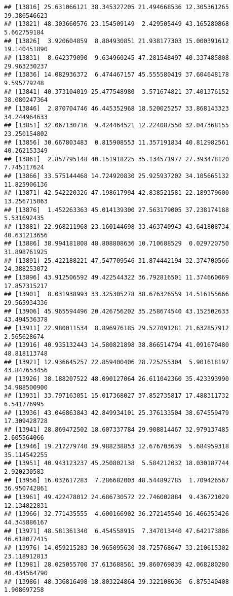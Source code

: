 \documentclass[
]{article}
\begin{document}
\begin{verbatim}
## [13816] 25.631066121 38.345327205 21.494668536 12.305361265 39.386546623
## [13821] 48.303660576 23.154509149  2.429505449 43.165280868  5.662759184
## [13826]  3.920604859  8.804930851 21.938177303 15.000391612 19.140451890
## [13831]  8.642379090  9.634960245 47.281548497 40.337485808 29.963230237
## [13836] 14.082936372  6.474467157 45.555580419 37.604648178  9.595779248
## [13841] 40.373104019 25.477548980  3.571674821 37.401376152 38.080247364
## [13846]  2.870704746 46.445352968 18.520025257 33.868143323 34.244964633
## [13851] 32.067130716  9.424464521 12.224087550 32.047368155 23.250154802
## [13856] 30.667803483  0.815908553 11.357191834 40.812982561 40.262153349
## [13861]  2.857795148 40.151918225 35.134571977 27.393478120  7.745117624
## [13866] 33.575144468 14.724920830 25.925937202 34.105665132 11.825906136
## [13871] 42.542220326 47.198617994 42.838521581 22.189379600 13.256715063
## [13876]  1.452263363 45.014139300 27.563179005 37.238174188  5.531692435
## [13881] 22.968211968 23.160144698 33.463740943 43.641808734 40.631213656
## [13886] 38.994181808 48.808808636 10.710688529  0.029720750 31.898761925
## [13891] 25.422188221 47.547709546 31.874442194 32.374700566 24.388253072
## [13896] 43.912506592 49.422544322 36.792816501 11.374660069 17.857315217
## [13901]  8.031938993 33.325305278 38.676326559 14.516155666 29.565934336
## [13906] 45.965594496 20.426756202 35.258674540 43.152502633 43.494536378
## [13911] 22.980011534  8.896976185 29.527091281 21.632857912  2.565628674
## [13916] 40.935132443 14.580821898 38.866514794 41.091670480 48.818113748
## [13921] 12.936645257 22.859400406 28.725255304  5.901618197 43.847653456
## [13926] 38.188207522 48.090127064 26.611042360 35.423393990 34.988500900
## [13931] 33.797163051 15.017368027 37.852735817 17.488311732  6.541776995
## [13936] 43.046863843 42.849934101 25.376133504 38.674559479 17.309428728
## [13941] 28.869472502 18.607337784 29.908814467 32.979137485  2.605564066
## [13946] 19.217279740 39.988238853 12.676703639  5.684959318 35.114542255
## [13951] 40.943123237 45.250802138  5.584212032 18.030187744  2.920230583
## [13956] 16.032617283  7.286682003 48.544892785  1.709426567 36.950742861
## [13961] 49.422478012 24.686730572 22.746002884  9.436721029 12.134822831
## [13966] 32.771435555  4.600166902 36.272145540 16.466353426 44.345886167
## [13971] 48.581361340  6.454558915  7.347013440 47.642173886 46.618077415
## [13976] 14.059215283 30.965095630 38.725768647 33.210615302 23.118912813
## [13981] 28.025055700 37.613688561 39.860769839 42.068280280 40.434564790
## [13986] 48.336816498 18.803224864 39.322108636  6.875340408  1.908697258

\end{verbatim}
\end{document}
